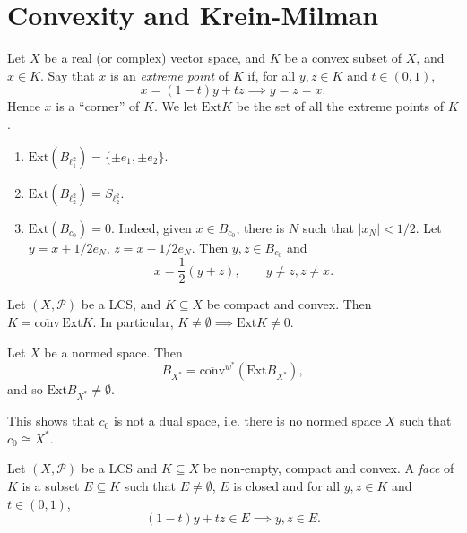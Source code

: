 \documentclass[12pt]{article}
\begin{document}
\newpage

\section{Convexity and Krein-Milman}%
\label{sec:ckm}

Let $X$ be a real (or complex) vector space, and $K$ be a convex subset of $X$, and $x \in K$. Say that $x$ is an \emph{extreme point} of $K$ if, for all $y, z \in K$ and $t \in (0, 1)$,
\[
x = (1 - t) y + tz \implies y = z = x.
\]
Hence $x$ is a ``corner'' of $K$. We let $\mathrm{Ext} K$ be the set of all the extreme points of $K$.

\begin{exbox}
	\begin{enumerate}
		\item $\mathrm{Ext}(B_{\ell_1^2}) = \{\pm e_1, \pm e_2\}$.
		\item $\mathrm{Ext}(B_{\ell_2^2}) = S_{\ell_2^2}$.
		\item $\mathrm{Ext}(B_{c_0}) = 0$. Indeed, given $x \in B_{c_0}$, there is $N$ such that $|x_N| < 1/2$. Let $y = x + 1/2 e_N$, $z = x - 1/2 e_N$. Then $y, z \in B_{c_0}$ and
			\[
			x = \frac{1}{2}(y + z), \qquad y \neq z, z \neq x.
			\]
	\end{enumerate}
\end{exbox}

\begin{theorem}
	Let $(X, \mathcal{P})$ be a LCS, and $K \subseteq X$ be compact and convex. Then $K = \overline{\mathrm{conv}} \, \mathrm{Ext} K$. In particular, $K \neq \emptyset \implies \mathrm{Ext} K \neq 0$.
\end{theorem}

\begin{corollary}
	Let $X$ be a normed space. Then
	\[
	B_{X^{\ast}} = \overline{\mathrm{conv}}^{w^{\ast}} (\mathrm{Ext} B_{X^{\ast}}),
	\]
	and so $\mathrm{Ext} B_{X^{\ast}} \neq \emptyset$.
\end{corollary}

\begin{remark}
	This shows that $c_0$ is not a dual space, i.e. there is no normed space $X$ such that $c_0 \cong X^{\ast}$.
\end{remark}

Let $(X, \mathcal{P})$ be a LCS and $K \subseteq X$ be non-empty, compact and convex. A \emph{face} of $K$ is a subset $E \subseteq K$ such that $E \neq \emptyset$, $E$ is closed and for all $y, z \in K$ and $t \in (0, 1)$,
\[
	(1 - t)y + tz \in E \implies y, z \in E.
\]
\end{document}
